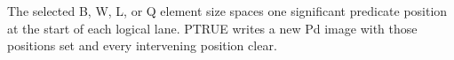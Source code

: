The selected B, W, L, or Q element size spaces one significant predicate
position at the start of each logical lane.  PTRUE writes a new Pd image with
those positions set and every intervening position clear.
